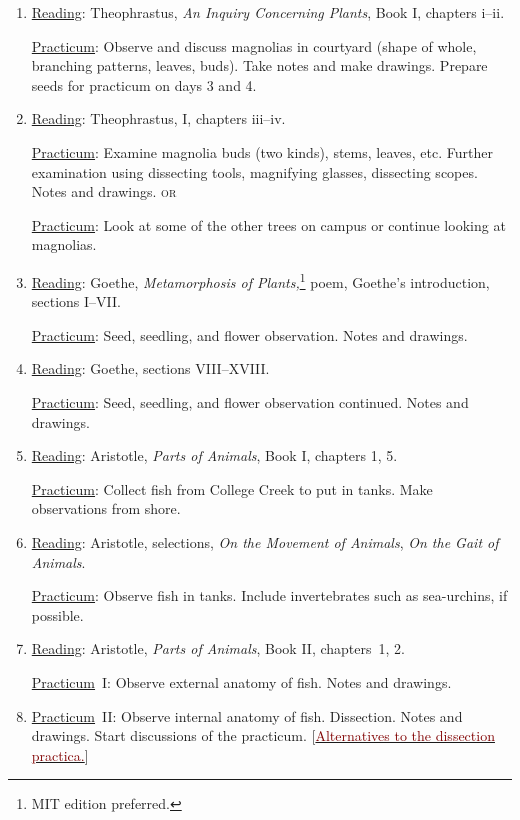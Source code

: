 \documentclass{article}
\newcommand{\rd}{\uline{Reading}}
\newcommand{\pc}{\uline{Practicum}}
\begin{document}
\begin{enumerate}

\item \rd: Theophrastus, \emph{An Inquiry Concerning Plants}, Book I, chapters i--ii.

\pc: Observe and discuss magnolias in courtyard (shape of whole, branching patterns, leaves, buds). Take notes and make drawings. Prepare seeds for practicum on days 3 and 4.

\item \rd: Theophrastus, I, chapters iii--iv.

\pc: Examine magnolia buds (two kinds), stems, leaves, etc. Further examination using dissecting tools, magnifying glasses, dissecting scopes. Notes and drawings. \textsc{or}

\pc: Look at some of the other trees on campus or continue looking at magnolias.

\item \rd: Goethe, \emph{Metamorphosis of Plants,}\footnote{MIT edition preferred.} poem, Goethe’s introduction, sections I--VII.

\pc: Seed, seedling, and flower observation. Notes and drawings.

\item \rd: Goethe, sections VIII--XVIII.

\pc: Seed, seedling, and flower observation continued. Notes and drawings.

\item \rd: Aristotle, \emph{Parts of Animals}, Book I, chapters 1, 5.

\pc: Collect fish from College Creek to put in tanks. Make observations from shore.

\item \rd: Aristotle, selections, \emph{On the Movement of Animals}, \emph{On the Gait of Animals}.

\pc: Observe fish in tanks. Include invertebrates such as sea-urchins, if possible.

\item \rd: Aristotle, \emph{Parts of Animals}, Book II, chapters\ 1, 2.

\pc\ I: Observe external anatomy of fish. Notes and drawings.

\item \pc\ II: Observe internal anatomy of fish. Dissection. Notes and drawings. Start discussions of the practicum. [\href{https://sjca.sharepoint.com/:b:/r/sites/Departments/Faculty/Documents/Annapolis/Freshman\%20Lab/Schedule/Alternatives_dissection.pdf?csf=1&web=1&e=tpt1w6}{\textcolor{Maroon}{Alternatives to the dissection practica.}}]


\end{enumerate}
\end{document}
